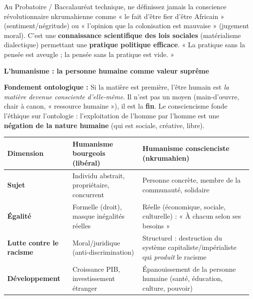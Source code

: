 \documentclass[11pt]{article}
\begin{document}
\begin{attention}
Au Probatoire / Baccalauréat technique, ne définissez jamais la conscience révolutionnaire nkrumahienne comme « le fait d'être fier d'être Africain » (sentiment/négritude) ou « l'opinion que la colonisation est mauvaise » (jugement moral). C'est une \textbf{connaissance scientifique des lois sociales} (matérialisme dialectique) permettant une \textbf{pratique politique efficace}. « La pratique sans la pensée est aveugle ; la pensée sans la pratique est vide. »
\end{attention}

\textbf{L'humanisme : la personne humaine comme valeur suprême}\par

\textbf{Fondement ontologique :} Si la matière est première, l'être humain est \emph{la matière devenue consciente d'elle-même}. Il n'est pas un moyen (main-d'œuvre, chair à canon, « ressource humaine »), il est la \textbf{fin}. Le consciencisme fonde l'éthique sur l'ontologie : l'exploitation de l'homme par l'homme est une \textbf{négation de la nature humaine} (qui est sociale, créative, libre).

\begin{propriete}
\begin{center}
\begin{tabularx}{\linewidth}{|l|X|X|}\hline
\textbf{Dimension} & \textbf{Humanisme bourgeois (libéral)} & \textbf{Humanisme conscienciste (nkrumahien)} \\ \hline
\textbf{Sujet} & Individu abstrait, propriétaire, concurrent & Personne concrète, membre de la communauté, solidaire \\ \hline
\textbf{Égalité} & Formelle (droit), masque inégalités réelles & Réelle (économique, sociale, culturelle) : « À chacun selon ses besoins » \\ \hline
\textbf{Lutte contre le racisme} & Moral/juridique (anti-discrimination) & Structurel : destruction du système capitaliste/impérialiste qui \emph{produit} le racisme \\ \hline
\textbf{Développement} & Croissance PIB, investissement étranger & Épanouissement de la personne humaine (santé, éducation, culture, pouvoir) \\ \hline
\end{tabularx}
\end{center}
\end{propriete}
\end{document}
